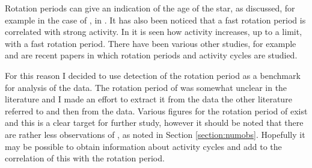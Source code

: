 Rotation periods can give an indication of the age of the star, as discussed,
for example in the case of \ross, in \citet{wargelin08}. It has also been
noticed that a fast rotation period is correlated with strong activity. In
\citet{mohanty03} it is seen how activity increases, up to a limit, with a fast
rotation period. There have been various other studies, for example
\citet{aizawa22} and \citet{magaudda22} are recent papers in which rotation
periods and activity cycles are studied.

For this reason I decided to use detection of the rotation period as a benchmark
for analysis of the {\rem} data. The rotation period of {\ross} was somewhat
unclear in the literature and I made an effort to extract it from the data the
other literature referred to and then from the {\rem} data. Various figures for
the rotation period of {\bstar} exist and this is a clear target for further
study, however it should be noted that there are rather less observations of
\bstar, as noted in Section \ref{section:numobs}. Hopefully it may be possible
to obtain information about activity cycles and add to the correlation of this
with the rotation period.

